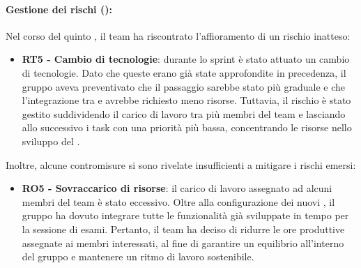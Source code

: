 \paragraph*{Gestione dei rischi ():}
\par Nel corso del quinto , il team ha riscontrato l'affioramento di un rischio inatteso:
\begin{itemize}
  \item \textbf{RT5 - Cambio di tecnologie}: durante lo sprint è stato attuato un cambio di tecnologie. Dato che queste erano già state approfondite in precedenza, il gruppo aveva preventivato che il passaggio sarebbe stato più graduale e che l'integrazione tra  e  avrebbe richiesto meno risorse. Tuttavia, il rischio è stato gestito suddividendo il carico di lavoro tra più membri del team e lasciando allo  successivo i task con una priorità più bassa, concentrando le risorse nello sviluppo del .
\end{itemize}

\par Inoltre, alcune contromisure si sono rivelate insufficienti a mitigare i rischi emersi:
\begin{itemize}
  \item \textbf{RO5 - Sovraccarico di risorse}: il carico di lavoro assegnato ad alcuni membri del team è stato eccessivo. Oltre alla configurazione dei nuovi , il gruppo ha dovuto integrare tutte le funzionalità già sviluppate in tempo per la sessione di esami. Pertanto, il team ha deciso di ridurre le ore produttive assegnate ai membri interessati, al fine di garantire un equilibrio all’interno del gruppo e mantenere un ritmo di lavoro sostenibile.
\end{itemize}

